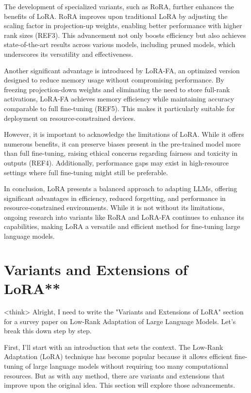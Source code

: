 \documentclass[conference]{IEEEtran}
\begin{document}
The development of specialized variants, such as RoRA, further enhances the benefits of LoRA. RoRA improves upon traditional LoRA by adjusting the scaling factor in projection-up weights, enabling better performance with higher rank sizes (REF3). This advancement not only boosts efficiency but also achieves state-of-the-art results across various models, including pruned models, which underscores its versatility and effectiveness.

Another significant advantage is introduced by LoRA-FA, an optimized version designed to reduce memory usage without compromising performance. By freezing projection-down weights and eliminating the need to store full-rank activations, LoRA-FA achieves memory efficiency while maintaining accuracy comparable to full fine-tuning (REF5). This makes it particularly suitable for deployment on resource-constrained devices.

However, it is important to acknowledge the limitations of LoRA. While it offers numerous benefits, it can preserve biases present in the pre-trained model more than full fine-tuning, raising ethical concerns regarding fairness and toxicity in outputs (REF4). Additionally, performance gaps may exist in high-resource settings where full fine-tuning might still be preferable.

In conclusion, LoRA presents a balanced approach to adapting LLMs, offering significant advantages in efficiency, reduced forgetting, and performance in resource-constrained environments. While it is not without its limitations, ongoing research into variants like RoRA and LoRA-FA continues to enhance its capabilities, making LoRA a versatile and efficient method for fine-tuning large language models.

\section{Variants and Extensions of LoRA**}
<think>
Alright, I need to write the "Variants and Extensions of LoRA" section for a survey paper on Low-Rank Adaptation of Large Language Models. Let's break this down step by step.

First, I'll start with an introduction that sets the context. The Low-Rank Adaptation (LoRA) technique has become popular because it allows efficient fine-tuning of large language models without requiring too many computational resources. But as with any method, there are variants and extensions that improve upon the original idea. This section will explore those advancements.
\end{document}
